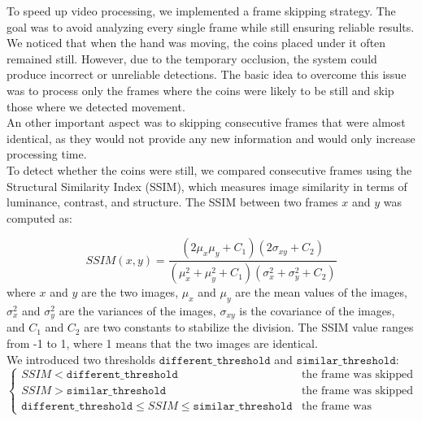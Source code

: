 To speed up video processing, we implemented a frame skipping strategy. The goal was to avoid analyzing every single frame while still ensuring reliable results.
We noticed that when the hand was moving, the coins placed under it often remained still. However, due to the temporary occlusion, the system could produce incorrect or unreliable detections.
The basic idea to overcome this issue was to process only the frames where the coins were likely to be still and skip those where we detected movement.\\
An other important aspect was to skipping consecutive frames that were almost identical, as they would not provide any new information and would only increase processing time.\\
To detect whether the coins were still, we compared consecutive frames using the Structural Similarity Index (SSIM), which measures image similarity in terms of luminance, contrast, and structure. 
The SSIM between two frames $x$ and $y$ was computed as:

\begin{equation}
    SSIM(x,y) = \frac{(2\mu_x\mu_y + C_1)(2\sigma_{xy} + C_2)}{(\mu_x^2 + \mu_y^2 + C_1)(\sigma_x^2 + \sigma_y^2 + C_2)}
\end{equation}
where $x$ and $y$ are the two images, $\mu_x$ and $\mu_y$ are the mean values of the images, $\sigma_x^2$ and $\sigma_y^2$ are the variances of the images, $\sigma_{xy}$ is the covariance of the images, and $C_1$ and $C_2$ are two constants to stabilize the division. The SSIM value ranges from -1 to 1, where 1 means that the two images are identical.\\
We introduced two thresholds $\texttt{different\_threshold}$ and $\texttt{similar\_threshold}$:
\begin{equation*}
    \begin{cases}
    SSIM < \texttt{different\_threshold} & \text{the frame was skipped} \\
    SSIM > \texttt{similar\_threshold} & \text{the frame was skipped} \\
    \texttt{different\_threshold} \leq SSIM \leq \texttt{similar\_threshold} & \text{the frame was processed}
    \end{cases}
\end{equation*}

